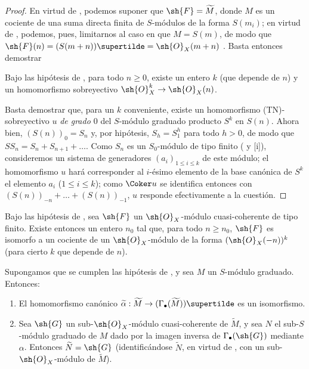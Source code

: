 \documentclass[oneside,10pt]{amsart}
\makeatletter
\renewcommand{\leq}{\leqslant}
\renewcommand{\geq}{\geqslant}
\newcommand{\ega@arrow}[2]{\mathchoice{#1}{#2}{#2}{#2}}
\renewcommand{\to}{\ega@arrow{\longrightarrow}{\rightarrow}}
\newcommand{\oldpage}[2][]{\marginnote{\normalfont\footnotesize\textbf{#1}~|~#2}\ignorespaces}
\let\EGAOriginalLabel\label
\renewcommand{\label}[1]{\phantomsection\EGAOriginalLabel{#1}}
\makeatother
\begin{document}
\begin{proof}
En virtud de , podemos suponer que $\sh{F}=\widetilde{M}$, donde $M$ es un cociente de una suma directa finita de $S$-módulos de la forma $S(m_i)$; en virtud de , podemos, pues, limitarnos al caso en que $M=S(m)$, de modo que $\sh{F}(n)=(S(m+n))\supertilde=\sh{O}_X(m+n)$ .
Basta entonces demostrar

\oldpage[II]{41}
  \begin{lemma}[2.7.9.1]
  \label{II.2.7.9.1}
  Bajo las hipótesis de , para todo $n\geq0$, existe un entero $k$ (que depende de $n$) y un homomorfismo sobreyectivo $\sh{O}_X^k\to\sh{O}_X(n)$.
  \end{lemma}

Basta  demostrar que, para un $k$ conveniente, existe un homomorfismo (TN)-sobreyectivo $u$ \emph{de grado $0$} del $S$-módulo graduado producto $S^k$ en $S(n)$.
Ahora bien, $(S(n))_0=S_n$ y, por hipótesis, $S_h=S_1^h$ para todo $h>0$, de modo que $SS_n=S_n+S_{n+1}+\ldots$.
Como $S_n$ es un $S_0$-módulo de tipo finito ( y [i]), consideremos un sistema de generadores $(a_i)_{1\leq i\leq k}$ de este módulo; el homomorfismo $u$ hará corresponder al $i$-ésimo elemento de la base canónica de $S^k$ el elemento $a_i$ ($1\leq i\leq k$); como $\Coker u$ se identifica entonces con $(S(n))_{-n}+\ldots+(S(n))_{-1}$, $u$ responde efectivamente a la cuestión.
\end{proof}

\begin{corollary}[2.7.10]
\label{II.2.7.10}
Bajo las hipótesis de , sea $\sh{F}$ un $\sh{O}_X$-módulo cuasi-coherente de tipo finito.
Existe entonces un entero $n_0$ tal que, para todo $n\geq n_0$, $\sh{F}$ es isomorfo a un cociente de un $\sh{O}_X$-módulo de la forma $(\sh{O}_X(-n))^k$ (para cierto $k$ que depende de $n$).
\end{corollary}

\begin{proposition}[2.7.11]
\label{II.2.7.11}
Supongamos que se cumplen las hipótesis de , y sea $M$ un $S$-módulo graduado.
Entonces:
\begin{enumerate}
  \item[{\rm(i)}] El homomorfismo canónico $\widetilde{\alpha}:\widetilde{M}\to(\Gamma_\bullet(\widetilde{M}))\supertilde$ es un isomorfismo.
  \item[{\rm(ii)}] Sea $\sh{G}$ un sub-$\sh{O}_X$-módulo cuasi-coherente de $\widetilde{M}$, y sea $N$ el sub-$S$-módulo graduado de $M$ dado por la imagen inversa de $\Gamma_\bullet(\sh{G})$ mediante $\alpha$.
    Entonces $\widetilde{N}=\sh{G}$ (identificándose $\widetilde{N}$, en virtud de , con un sub-$\sh{O}_X$-módulo de $\widetilde{M}$).
\end{enumerate}
\end{proposition}
\end{document}

